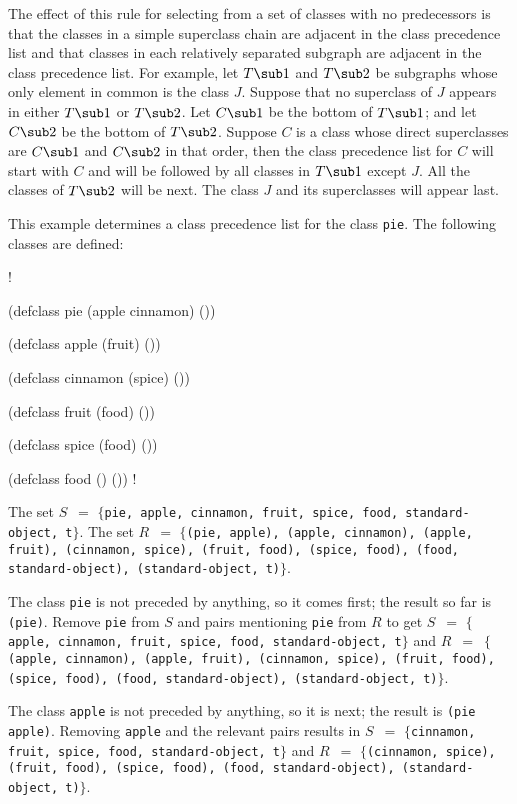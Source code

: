 The effect of this rule for selecting from a set of classes with no
predecessors is that the classes in a simple superclass chain are
adjacent in the class precedence list and that classes in each
relatively separated subgraph are adjacent in the class
precedence list. For example, let $T\sub 1$ and $T\sub 2$ be subgraphs
whose only element in common is the class $J$\negthinspace. Suppose
that no superclass of $J$ appears in either $T\sub 1$ or $T\sub 2$.
Let $C\sub 1$ be the bottom of $T\sub 1$; and let $C\sub 2$ be the
bottom of $T\sub 2$.  Suppose $C$ is a class whose direct superclasses
are $C\sub 1$ and $C\sub 2$ in that order, then the class precedence
list for $C$ will start with $C$ and will be followed by all classes
in $T\sub 1$ except $J$. All the classes of $T\sub 2$ will be next.
The class $J$ and its superclasses will appear last.

\endsubSection%


This example determines a class precedence list for the
class {\tt pie}.  The following classes are defined:

\screen!

(defclass pie (apple cinnamon) ())

(defclass apple (fruit) ())

(defclass cinnamon (spice) ())

(defclass fruit (food) ())

(defclass spice (food) ())

(defclass food () ())
\endscreen!

The set $S$~$=$ $\{${\tt pie, apple, cinnamon, fruit, spice, food,
standard-object, t}$\}$. The set $R$~$=$ $\{${\tt (pie, apple),
(apple, cinnamon), (apple, fruit), (cinnamon, spice), (fruit, food),
\hfil\break (spice, food), (food, standard-object), (standard-object,
t)}$\}$.

The class {\tt pie} is not preceded by anything, so it comes first;
the result so far is {\tt (pie)}.  Remove {\tt pie} from $S$ and pairs
mentioning {\tt pie} from $R$ to get $S$~$=$ $\{${\tt apple, cinnamon,
fruit, spice, food, standard-object, t}$\}$ and $R$~$=$~$\{${\tt
(apple, cinnamon), (apple, fruit), (cinnamon, spice), (fruit,
food),\hfil\break (spice, food), (food, standard-object),
(standard-object, t)}$\}$.

The class {\tt apple} is not preceded by anything, so it is next; the
result is {\tt (pie apple)}. Removing {\tt apple} and the relevant
pairs results in $S$~$=$ $\{${\tt cinnamon, fruit, spice, food,
standard-object, t}$\}$ and $R$~$=$ $\{${\tt (cinnamon, spice),
(fruit, food), (spice, food), (food, standard-object),\hfil\break
(standard-object, t)}$\}$.

